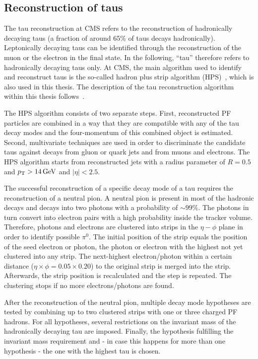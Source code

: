 \subsection{Reconstruction of taus}
\label{subsec:TauReconstruction}
The tau reconstruction at CMS refers to the reconstruction of hadronically decaying taus (a fraction of around 65\% of taus decays hadronically).
Leptonically decaying taus can be identified through the reconstruction of the muon or the electron in the final state.
In the following, ``tau''  therefore refers to hadronically decaying taus only.
At CMS, the main algorithm used to identify and reconstruct taus is the so-called hadron plus strip algorithm (HPS)~\cite{bib:CMS:TauReconstruction_8TeV,bib:CMS:TauReconstruction_7TeV}, which is also used in this thesis.
The description of the tau reconstruction algorithm within this thesis follows~\cite{bib:CMS:TauReconstruction_8TeV}.

The HPS algorithm consists of two separate steps. 
First, reconstructed PF particles are combined in a way that they are compatible with any of the tau decay modes and the four-momentum of this combined object is estimated.
Second, multivariate techniques are used in order to discriminate the candidate taus against decays from gluon or quark jets and from muons and electrons. 
The HPS algorithm starts from reconstructed jets with a radius parameter of $R=0.5$ and $p_{\text{T}}>14\,\text{Ge}\kern-0.06667em\text{V}$ and $|\eta|<2.5$.

The successful reconstruction of a specific decay mode of a tau requires the reconstruction of a neutral pion.
A neutral pion is present in most of the hadronic decays and decays into two photons with a probability of $\sim 99\%$. 
The photons in turn convert into electron pairs with a high probability inside the tracker volume.
Therefore, photons and electrons are clustered into strips in the $\eta-\phi$ plane in order to identify possible $\pi^0$.
The initial position of the strip equals the position of the seed electron or photon, \ie the photon or electron with the highest \pt not yet clustered into any strip.
The next-highest \pt electron/photon within a certain distance ($\eta \times \phi = 0.05 \times 0.20$) to the original strip is merged into the strip.
Afterwards, the strip position is recalculated and the step is repeated.
The clustering stops if no more electrons/photons are found.

After the reconstruction of the neutral pion, multiple decay mode hypotheses are tested by combining up to two clustered strips with one or three charged PF hadrons.
For all hypotheses, several restrictions on the invariant mass of the hadronically decaying tau are imposed.
Finally, the hypothesis fulfilling the invariant mass requirement and - in case this happens for more than one hypothesis - the one with the highest \pt tau is chosen.

